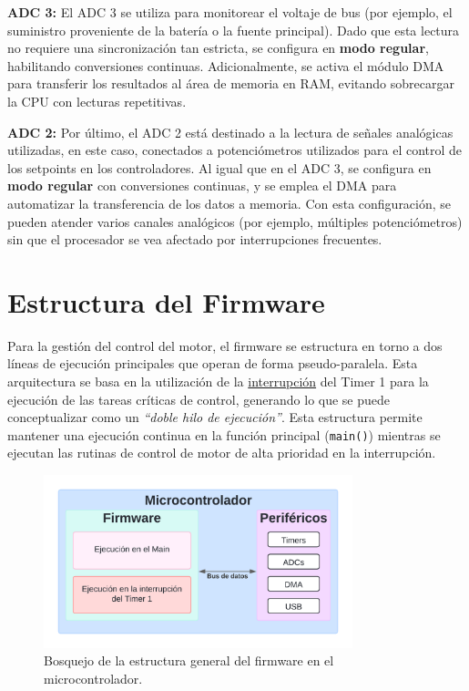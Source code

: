 \documentclass[11pt]{report}
\begin{document}
\textbf{ADC 3:} El ADC 3 se utiliza para monitorear el voltaje de bus (por ejemplo, el suministro proveniente de la batería o la fuente principal). Dado que esta lectura no requiere una sincronización tan estricta, se configura en \textbf{modo regular}, habilitando conversiones continuas. Adicionalmente, se activa el módulo DMA para transferir los resultados al área de memoria en RAM, evitando sobrecargar la CPU con lecturas repetitivas.

\textbf{ADC 2:} Por último, el ADC 2 está destinado a la lectura de señales analógicas utilizadas, en este caso, conectados a potenciómetros utilizados para el control de los setpoints en los controladores. Al igual que en el ADC 3, se configura en \textbf{modo regular} con conversiones continuas, y se emplea el DMA para automatizar la transferencia de los datos a memoria. Con esta configuración, se pueden atender varios canales analógicos (por ejemplo, múltiples potenciómetros) sin que el procesador se vea afectado por interrupciones frecuentes.

\section{Estructura del Firmware}

Para la gestión del control del motor, el firmware se estructura en torno a dos líneas de ejecución principales que operan de forma pseudo-paralela. Esta arquitectura se basa en la utilización de la \href{https://www.youtube.com/watch?v=poa_QBvtIBA}{interrupción} del Timer 1 para la ejecución de las tareas críticas de control, generando lo que se puede conceptualizar como un \emph{``doble hilo de ejecución''}.  Esta estructura permite mantener una ejecución continua en la función principal (\texttt{main()}) mientras se ejecutan las rutinas de control de motor de alta prioridad en la interrupción.

\begin{figure}[ht]
	\centering
	\includegraphics[width=0.8\textwidth]{imagenes/Diagramas/lineas de ejecucion.png}
	\caption{Bosquejo de la estructura general del firmware en el microcontrolador.}
	\label{firmware_microcontrolador}
\end{figure}
\FloatBarrier
\end{document}
